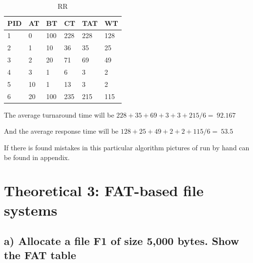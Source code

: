 \documentclass[11pt,a4paper]{article}
\theoremstyle{plain}
\theoremstyle{definition}
\theoremstyle{remark}
\numberwithin{equation}{section}
\begin{document}
\begin{table}[H]
    \centering
    \caption{RR}
    \label{t2-rr}
    \begin{tabular}{llllll}
        \hline
        \multicolumn{1}{|l|}{PID} & \multicolumn{1}{l|}{AT} & \multicolumn{1}{l|}{BT} & \multicolumn{1}{l|}{CT} & \multicolumn{1}{l|}{TAT} & \multicolumn{1}{l|}{WT} \\ \hline
        1                         & 0                       & 100                     & 228                     & 228                      & 128                     \\
        2                         & 1                       & 10                      & 36                      & 35                       & 25                      \\
        3                         & 2                       & 20                      & 71                      & 69                       & 49                      \\
        4                         & 3                       & 1                       & 6                       & 3                        & 2                       \\
        5                         & 10                      & 1                       & 13                      & 3                        & 2                       \\
        6                         & 20                      & 100                     & 235                     & 215                      & 115                    
    \end{tabular}
\end{table}

The average turnaround time will be $228+35+69+3+3+215/6=~92.167$

And the average response time will be $128+25+49+2+2+115/6=~53.5$

If there is found mistakes in this particular algorithm pictures of run by hand can be found in appendix.



\section*{Theoretical 3: FAT-based file systems}

\subsection*{a) Allocate a file F1 of size 5,000 bytes. Show the FAT table}
\end{document}
